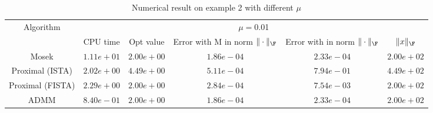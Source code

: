 \begin{table}
\centering
\begin{tabular}{|c|c|c|c|c|c|}

\hline
\multirow{2}{*}{ Algorithm} &\multicolumn{5}{c|}{$\mu=$0.01}\\\cline{2-6}
 &CPU time &Opt value &Error with M in norm $\|\cdot\|_\F$ &Error with in norm $\|\cdot\|_\F$ &$\|x\|_\F$\\\hline
Mosek & $1.11e+01$ & $2.00e+00$ & $1.86e-04$ & $2.33e-04$ & $2.00e+02$\\\hline
Proximal (ISTA) & $2.02e+00$ & $4.49e+00$ & $5.11e-04$ & $7.94e-01$ & $4.49e+02$\\\hline
Proximal (FISTA) & $2.29e+00$ & $2.00e+00$ & $2.84e-04$ & $7.54e-03$ & $2.00e+02$\\\hline
ADMM & $8.40e-01$ & $2.00e+00$ & $1.86e-04$ & $2.33e-04$ & $2.00e+02$\\\hline
\end{tabular}
\caption{Numerical result on example 2 with different $\mu$\label{example2}}
\end{table}
